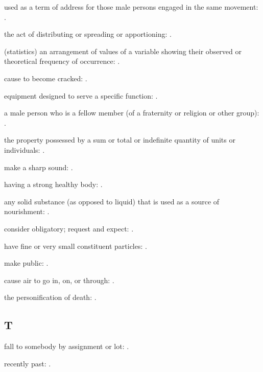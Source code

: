   used as a term of address for those male persons engaged in the same movement:   .

  the act of distributing or spreading or apportioning: .

  (statistics) an arrangement of values of a variable showing their observed or theoretical frequency of occurrence:   .

  cause to become cracked: .

  equipment designed to serve a specific function:   .

  a male person who is a fellow member (of a fraternity or religion or other group): .

  the property possessed by a sum or total or indefinite quantity of units or individuals:   .

  make a sharp sound:   .

  having a strong healthy body:   .

  any solid substance (as opposed to liquid) that is used as a source of nourishment:   .

  consider obligatory; request and expect:   .

  have fine or very small constituent particles: .

  make public:   .

  cause air to go in, on, or through: .

  the personification of death: .

\subsection*{T}

  fall to somebody by assignment or lot:   .

  recently past: .

